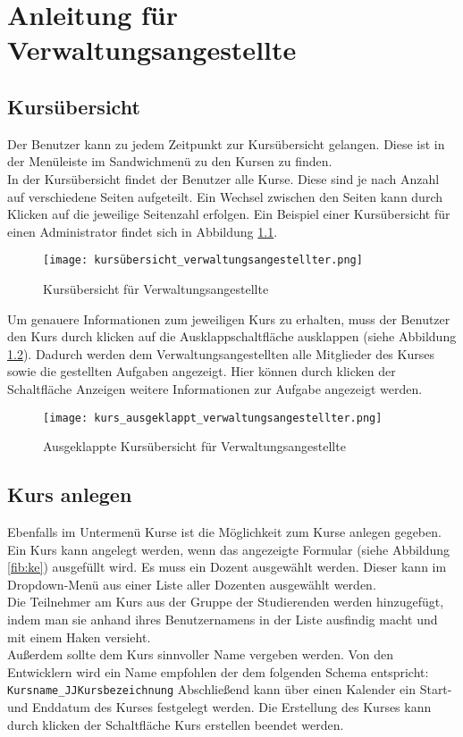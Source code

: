 
\chapter{Anleitung für Verwaltungsangestellte}
\label{sec:chap1}
\section{Kursübersicht}
Der Benutzer kann zu jedem Zeitpunkt zur Kursübersicht gelangen. Diese ist in der Menüleiste im Sandwichmenü zu den Kursen zu finden.\\
In der Kursübersicht findet der Benutzer alle Kurse. Diese sind je nach Anzahl auf verschiedene Seiten aufgeteilt. Ein Wechsel zwischen den Seiten kann durch Klicken auf die jeweilige Seitenzahl erfolgen. Ein Beispiel einer Kursübersicht für einen Administrator findet sich in Abbildung \ref{fib:kü}.

\begin{figure}[h]
\centering
\texttt{[image: kursübersicht\_verwaltungsangestellter.png]}
\caption{Kursübersicht für Verwaltungsangestellte}
\label{fib:kü}
\end{figure}

Um genauere Informationen zum jeweiligen Kurs zu erhalten, muss der Benutzer den Kurs durch klicken auf die Ausklappschaltfläche ausklappen (siehe Abbildung \ref{fib:kü-ausgeklappt}). Dadurch werden dem Verwaltungsangestellten alle Mitglieder des Kurses sowie die gestellten Aufgaben angezeigt. Hier können durch klicken der Schaltfläche \glqq Anzeigen\grqq{} weitere Informationen zur Aufgabe angezeigt werden. 

\begin{figure}[h]
\centering
\texttt{[image: kurs\_ausgeklappt\_verwaltungsangestellter.png]}
\caption{Ausgeklappte Kursübersicht für Verwaltungsangestellte}
\label{fib:kü-ausgeklappt}
\end{figure}

\section{Kurs anlegen}
Ebenfalls im Untermenü Kurse ist die Möglichkeit zum Kurse anlegen gegeben.\\
Ein Kurs kann angelegt werden, wenn das angezeigte Formular (siehe Abbildung \ref{fib:ke}) ausgefüllt wird. Es muss ein Dozent ausgewählt werden. Dieser kann im Dropdown-Menü aus einer Liste aller Dozenten ausgewählt werden. \\
Die Teilnehmer am Kurs aus der Gruppe der Studierenden werden hinzugefügt, indem man sie anhand ihres Benutzernamens in der Liste ausfindig macht und mit einem Haken versieht. \\
Außerdem sollte dem Kurs sinnvoller Name vergeben werden. Von den Entwicklern wird ein Name empfohlen der dem folgenden Schema entspricht: \\
\verb/Kursname_JJKursbezeichnung/
Abschließend kann über einen Kalender ein Start- und Enddatum des Kurses festgelegt werden. 
Die Erstellung des Kurses kann durch klicken der Schaltfläche \glqq Kurs erstellen\grqq{} beendet werden.

